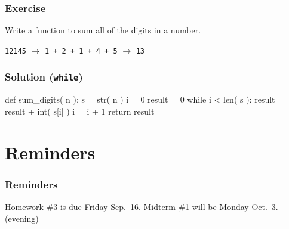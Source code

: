 \documentclass[11pt]{beamer}
\begin{document}
\begin{frame}[fragile]
  \frametitle{Exercise}
  \Enlarge

  Write a function to sum all of the digits in a number.  %

  \begin{center}
  \texttt{12145} $\rightarrow$ \texttt{1 + 2 + 1 + 4 + 5} $\rightarrow$ \texttt{13}
  \end{center}
\end{frame}

\begin{frame}[fragile]
  \frametitle{Solution (\texttt{while})}
  \Enlarge

  \begin{semiverbatim}
def sum_digits( n ):
    s = str( n )
    i = 0
    result = 0
    while i < len( s ):
        result = result + int( s[i] )
        i = i + 1
    return result
  \end{semiverbatim}
\end{frame}

\section{Reminders}

\begin{frame}
  \frametitle{Reminders}
  \Enlarge

  \begin{itemize}
  \myitem  Homework \#3 is due Friday Sep.\ 16.
  \myitem  Midterm \#1 will be Monday Oct.\ 3. (evening)
  \end{itemize}
\end{frame}
\end{document}
